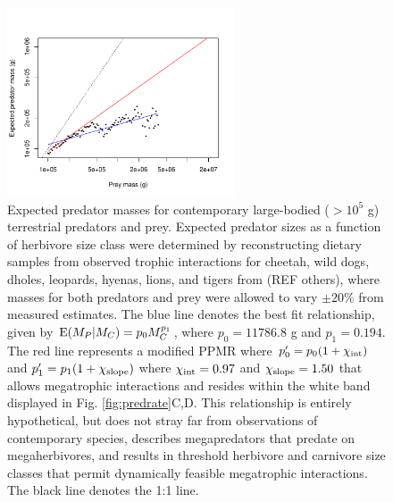 \documentclass[]{rsos}%
\begin{document}
\begin{figure}
  \centering
  \includegraphics[width=0.6\textwidth]{fig_meanpredsize34_log.pdf}
  \caption{
	 Expected predator masses for contemporary large-bodied ($>10^5$ g) terrestrial predators and prey. 
	 Expected predator sizes as a function of herbivore size class were determined by reconstructing dietary samples from observed trophic interactions for cheetah, wild dogs, dholes, leopards, hyenas, lions, and tigers from \cite{Hayward2008} (REF others), where masses for both predators and prey were allowed to vary $\pm 20\%$ from measured estimates.
	 The blue line denotes the best fit relationship, given by ${\rm E}(M_P|M_C) = p_0 M_C^{p_1}$, where $p_0 = 11786.8$ g and $p_1 = 0.194$.
	 The red line represents a modified PPMR where $p_0^\prime = p_0(1+\chi_{\rm int})$ and $p_1^\prime = p_1(1+\chi_{\rm slope})$ where $\chi_{\rm int} = 0.97$ and $\chi_{\rm slope} = 1.50$ that allows megatrophic interactions and resides within the white band displayed in Fig. \ref{fig:predrate}C,D.
	 This relationship is entirely hypothetical, but does not stray far from observations of contemporary species, describes megapredators that predate on megaherbivores, and results in threshold herbivore and carnivore size classes that permit dynamically feasible megatrophic interactions.
	 The black line denotes the 1:1 line.
  }
  \label{fig:ppmr}
\end{figure}
\end{document}
